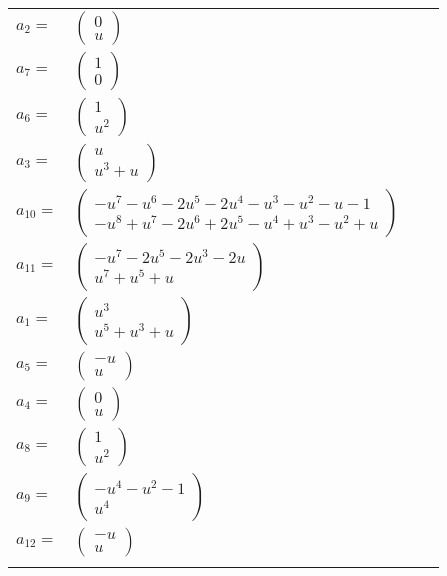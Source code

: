 \documentclass[1p]{elsarticle_modified}
\theoremstyle{definition}
\begin{document}
\begin{tabular}{m{7pt} m{180pt} m{7pt} m{180pt} }
\flushright $a_{2}=$&$\begin{pmatrix}0\\u\end{pmatrix}$ \\
\flushright $a_{7}=$&$\begin{pmatrix}1\\0\end{pmatrix}$ \\
\flushright $a_{6}=$&$\begin{pmatrix}1\\u^2\end{pmatrix}$ \\
\flushright $a_{3}=$&$\begin{pmatrix}u\\u^3+u\end{pmatrix}$ \\
\flushright $a_{10}=$&$\begin{pmatrix}- u^7- u^6-2 u^5-2 u^4- u^3- u^2- u-1\\- u^8+u^7-2 u^6+2 u^5- u^4+u^3- u^2+u\end{pmatrix}$ \\
\flushright $a_{11}=$&$\begin{pmatrix}- u^7-2 u^5-2 u^3-2 u\\u^7+u^5+u\end{pmatrix}$ \\
\flushright $a_{1}=$&$\begin{pmatrix}u^3\\u^5+u^3+u\end{pmatrix}$ \\
\flushright $a_{5}=$&$\begin{pmatrix}- u\\u\end{pmatrix}$ \\
\flushright $a_{4}=$&$\begin{pmatrix}0\\u\end{pmatrix}$ \\
\flushright $a_{8}=$&$\begin{pmatrix}1\\u^2\end{pmatrix}$ \\
\flushright $a_{9}=$&$\begin{pmatrix}- u^4- u^2-1\\u^4\end{pmatrix}$ \\
\flushright $a_{12}=$&$\begin{pmatrix}- u\\u\end{pmatrix}$\\&\end{tabular}
\end{document}

